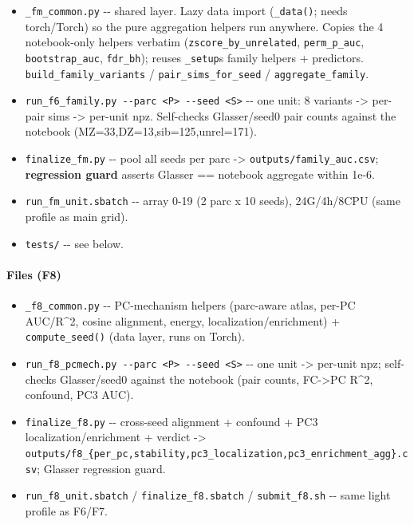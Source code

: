 \begin{itemize}
\tightlist
\item
  \texttt{\_fm\_common.py} -\/- shared layer. Lazy data import (\texttt{\_data()}; needs torch/Torch) so the pure aggregation helpers run anywhere. Copies the 4 notebook-only helpers verbatim (\texttt{zscore\_by\_unrelated}, \texttt{perm\_p\_auc}, \texttt{bootstrap\_auc}, \texttt{fdr\_bh}); reuses \texttt{\_setup}\textquotesingle s family helpers + predictors. \texttt{build\_family\_variants} / \texttt{pair\_sims\_for\_seed} / \texttt{aggregate\_family}.
\item
  \texttt{run\_f6\_family.py\ -\/-parc\ \textless{}P\textgreater{}\ -\/-seed\ \textless{}S\textgreater{}} -\/- one unit: 8 variants -\textgreater{} per-pair sims -\textgreater{} per-unit npz. Self-checks Glasser/seed0 pair counts against the notebook (MZ=33,DZ=13,sib=125,unrel=171).
\item
  \texttt{finalize\_fm.py} -\/- pool all seeds per parc -\textgreater{} \texttt{outputs/family\_auc.csv}; \textbf{regression guard} asserts Glasser == notebook aggregate within 1e-6.
\item
  \texttt{run\_fm\_unit.sbatch} -\/- array 0-19 (2 parc x 10 seeds), 24G/4h/8CPU (same profile as main grid).
\item
  \texttt{tests/} -\/- see below.
\end{itemize}

\paragraph{Files (F8)}\label{files-f8}

\begin{itemize}
\tightlist
\item
  \texttt{\_f8\_common.py} -\/- PC-mechanism helpers (parc-aware atlas, per-PC AUC/R\^{}2, cosine alignment, energy, localization/enrichment) + \texttt{compute\_seed()} (data layer, runs on Torch).
\item
  \texttt{run\_f8\_pcmech.py\ -\/-parc\ \textless{}P\textgreater{}\ -\/-seed\ \textless{}S\textgreater{}} -\/- one unit -\textgreater{} per-unit npz; self-checks Glasser/seed0 against the notebook (pair counts, FC-\textgreater PC R\^{}2, confound, PC3 AUC).
\item
  \texttt{finalize\_f8.py} -\/- cross-seed alignment + confound + PC3 localization/enrichment + verdict -\textgreater{} \texttt{outputs/f8\_\{per\_pc,stability,pc3\_localization,pc3\_enrichment\_agg\}.csv}; Glasser regression guard.
\item
  \texttt{run\_f8\_unit.sbatch} / \texttt{finalize\_f8.sbatch} / \texttt{submit\_f8.sh} -\/- same light profile as F6/F7.
\end{itemize}

